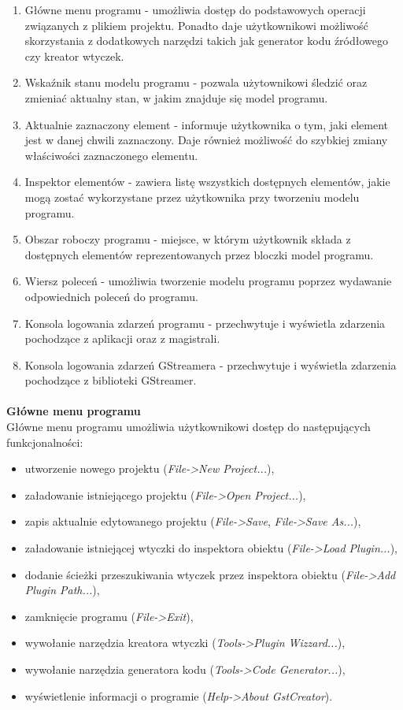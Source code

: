 \documentclass[12pt]{article}
\begin{document}
\begin{enumerate}
  \setlength{\itemsep}{0em}
\item Główne menu programu - umożliwia dostęp do podstawowych operacji związanych z plikiem projektu. Ponadto daje użytkownikowi możliwość skorzystania z dodatkowych narzędzi takich jak generator kodu źródłowego czy kreator wtyczek.
\item Wskaźnik stanu modelu programu - pozwala użytownikowi śledzić oraz zmieniać aktualny stan, w jakim znajduje się model programu.
\item Aktualnie zaznaczony element - informuje użytkownika o tym, jaki element jest w danej chwili zaznaczony. Daje również możliwość do szybkiej zmiany właściwości zaznaczonego elementu.
\item Inspektor elementów - zawiera listę wszystkich dostępnych elementów, jakie mogą zostać wykorzystane przez użytkownika przy tworzeniu modelu programu.
\item Obszar roboczy programu - miejsce, w którym użytkownik składa z dostępnych elementów reprezentowanych przez bloczki model programu.
\item Wiersz poleceń - umożliwia tworzenie modelu programu poprzez wydawanie odpowiednich poleceń do programu.
\item Konsola logowania zdarzeń programu - przechwytuje i wyświetla zdarzenia pochodzące z aplikacji oraz z magistrali.
\item Konsola logowania zdarzeń GStreamera - przechwytuje i wyświetla zdarzenia pochodzące z biblioteki GStreamer.
\end{enumerate}\paragraph{}\vspace{-3mm}
\textbf{Główne menu programu} \\
Główne menu programu umożliwia użytkownikowi dostęp do następujących funkcjonalności:
\begin{itemize}
  \setlength{\itemsep}{0em}
\item utworzenie nowego projektu (\textit{File->New Project...}),
\item załadowanie istniejącego projektu (\textit{File->Open Project...}),
\item zapis aktualnie edytowanego projektu (\textit{File->Save}, \textit{File->Save As...}),
\item załadowanie istniejącej wtyczki do inspektora obiektu (\textit{File->Load Plugin...}),
\item dodanie ścieżki przeszukiwania wtyczek przez inspektora obiektu (\textit{File->Add Plugin Path...}),
\item zamknięcie programu (\textit{File->Exit}),
\item wywołanie narzędzia kreatora wtyczki (\textit{Tools->Plugin Wizzard...}),
\item wywołanie narzędzia generatora kodu (\textit{Tools->Code Generator...}),
\item wyświetlenie informacji o programie (\textit{Help->About GstCreator}).
\end{itemize}
\end{document}
